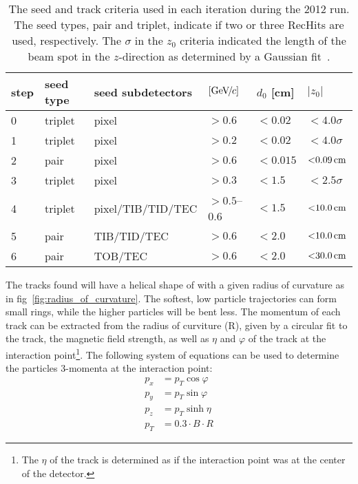 \begin{table}[htbp]
	\caption{The seed and track criteria used in each iteration during the 2012 run. The seed types, pair and triplet, indicate if two or three RecHits are used, respectively. The $\sigma$ in the $z_0$ criteria indicated the length of the beam spot in the $z$-direction as determined by a Gaussian fit~\cite{Tracking2012}.}
	\centering
    \begin{tabular}{llllll}
		\hline
		step  & seed type & seed subdetectors & \pt $[{\text{Ge\hspace{-.08em}V\hspace{-0.16em}/\hspace{-0.08em}}c}]$ & $d_0$ [cm] & $|z_0|$ \\
		\hline
		0     & triplet   & pixel             & ${>}0.6$     & ${<}0.02$  & ${<}4.0\sigma$ \\
		1     & triplet   & pixel             & ${>}0.2$     & ${<}0.02$  & ${<}4.0\sigma$ \\
		2     & pair      & pixel             & ${>}0.6$     & ${<}0.015$ & ${<}0.09\,\text{cm}$ \\
		3     & triplet   & pixel             & ${>}0.3$     & ${<}1.5$   & ${<}2.5\sigma$ \\
		4     & triplet   & pixel/TIB/TID/TEC & ${>}0.5$--0.6 & ${<}1.5$   & ${<}10.0\,\text{cm}$ \\
		5     & pair      & TIB/TID/TEC       & ${>}0.6$     & ${<}2.0$   & ${<}10.0\,\text{cm}$ \\
		6     & pair      & TOB/TEC           & ${>}0.6$     & ${<}2.0$   & ${<}30.0\,\text{cm}$ \\
		\hline
    \end{tabular}
	\label{tab:track_seeding}
\end{table}

The tracks found will have a helical shape of with a given radius of curvature as in fig~\ref{fig:radius_of_curvature}.
The softest, low \pt particle trajectories can form small rings, while the higher \pt particles will be bent less.
The momentum of each track can be extracted from the radius of curviture (R), given by a circular fit to the track, the magnetic field strength, as well as $\eta$ and $\varphi$ of the track at the interaction point\footnote{The $\eta$ of the track is determined as if the interaction point was at the center of the detector.}.
The following system of equations can be used to determine the particles 3-momenta at the interaction point:
\begin{equation}
	\begin{aligned}
		p_{x}&=p_{T}\cos\varphi\\
		p_{y}&=p_{T}\sin\varphi\\
		p_{z}&=p_{T}\sinh\eta\\
		p_{T}&=0.3\cdot{B}\cdot{R}
	\end{aligned}
\end{equation}

